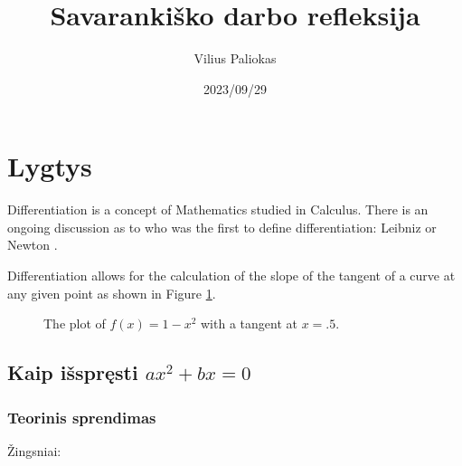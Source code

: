\documentclass[a4paper]{article}
\title{Savarankiško darbo refleksija}
\author{Vilius Paliokas}
\date{2023/09/29}
\begin{document}
\maketitle

\section{Lygtys}

Differentiation is a concept of Mathematics studied in Calculus. There is an
ongoing discussion as to who was the first to define differentiation: Leibniz
or Newton \cite{bardi2006calculus}.

Differentiation allows for the calculation of the slope of the tangent of a
curve at any given point as shown in Figure \ref{exampleplot}.

\begin{figure}[!htbp]
      \begin{center}
      \end{center}
      \caption{The plot of $f(x)=1-x^2$ with a tangent at
            $x=.5$.}\label{exampleplot}
\end{figure}

\subsection{Kaip išspręsti $ ax^{2}+bx=0 $}

\subsubsection{Teorinis sprendimas}

Žingsniai:
\end{document}
